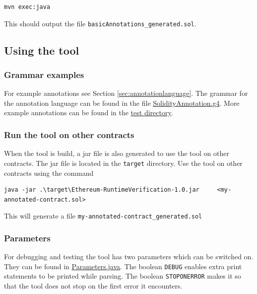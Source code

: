 \documentclass[a4paper]{article}
\begin{document}
\begin{verbatim}
mvn exec:java
\end{verbatim}

This should output the file \texttt{basicAnnotations\_generated.sol}.

\hypertarget{using-the-tool}{%
\subsection{Using the tool}\label{using-the-tool}}

\hypertarget{grammar-examples}{%
\subsubsection{Grammar examples}\label{grammar-examples}}

For example annotations see Section \ref{sec:annotationlanguage}. The grammar for the annotation
language can be found in the file
\href{https://github.com/LarsStegeman/EthereumRuntimeMonitoring/blob/master/src/main/antlr4/SolidityAnnotated.g4}{SolidityAnnotation.g4}. More
example annotations can be found in the \href{https://github.com/LarsStegeman/EthereumRuntimeMonitoring/tree/master/src/test/contracts}{test
directory}.

\hypertarget{run-the-tool-on-other-contracts}{%
\subsubsection{Run the tool on other
contracts}\label{run-the-tool-on-other-contracts}}

When the tool is build, a jar file is also generated to use the tool on
other contracts. The jar file is located in the \texttt{target}
directory. Use the tool on other contracts using the command

\begin{verbatim}
java -jar .\target\Ethereum-RuntimeVerification-1.0.jar     <my-annotated-contract.sol>
\end{verbatim}

This will generate a file \texttt{my-annotated-contract\_generated.sol}

\hypertarget{parameters}{%
\subsubsection{Parameters}\label{parameters}}

For debugging and testing the tool has two parameters which can be
switched on. They can be found in
\href{https://github.com/LarsStegeman/EthereumRuntimeMonitoring/blob/master/src/main/java/utils/Parameters.java}{Parameters.java}. The boolean
\texttt{DEBUG} enables extra print statements to be printed while
parsing. The boolean \texttt{STOPONERROR} makes it so that the tool does
not stop on the first error it encounters.
\end{document}

